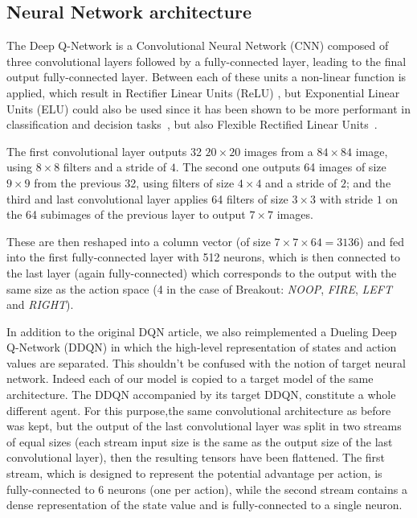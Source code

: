 \documentclass[letterpaper]{article}
\begin{document}
\subsection{Neural Network architecture}

The Deep Q-Network is a Convolutional Neural Network (CNN) composed of three convolutional layers followed by a fully-connected layer,
leading to the final output fully-connected layer.
Between each of these units a non-linear function is applied, which result in Rectifier Linear Units (ReLU) \citep{krizhevsky2012imagenet}, but Exponential Linear Units (ELU) could
also be used since it has been shown to be more performant in classification and decision tasks~\citep{DBLP:journals/corr/ClevertUH15}, but also
Flexible Rectified Linear Units~\citep{qiu2017flexible}.

The first convolutional layer outputs 32 $20 \times 20$ images from a $84 \times 84$ image, using $8 \times 8$ filters and a stride of $4$. The second one outputs
64 images of size $9 \times 9$ from the previous 32, using filters of size $4 \times 4$ and a stride of $2$; and the third and last convolutional layer
applies 64 filters of size $3 \times 3$ with stride $1$ on the 64 subimages of the previous layer to output $7 \times 7$ images.

These are then reshaped into a column vector (of size $7 \times 7 \times 64 = 3136$) and fed into the first fully-connected layer with 512 neurons,
which is then connected to the last layer (again fully-connected) which corresponds to the output with the same size as the action space (4 in the
case of Breakout: \textit{NOOP}, \textit{FIRE}, \textit{LEFT} and \textit{RIGHT}).

In addition to the original DQN article, we also reimplemented a Dueling Deep Q-Network \citep{DBLP:journals/corr/WangFL15} (DDQN) in which the high-level
representation of states
and action values are separated. This shouldn't be confused with the notion of target neural network. Indeed each of our model is copied to a target model
of the same architecture. The DDQN accompanied by its target DDQN, constitute a whole different agent.
For this purpose,the same convolutional architecture as before was kept, but the output of the last convolutional layer was split in two streams of
equal sizes (each stream input size is the same as the output size of the last convolutional layer), then the resulting tensors have been flattened.
The first stream, which is designed to represent the potential advantage per action, is fully-connected to 6 neurons (one per action), while the second stream
contains a dense representation of the state value and is fully-connected to a single neuron.
\end{document}
